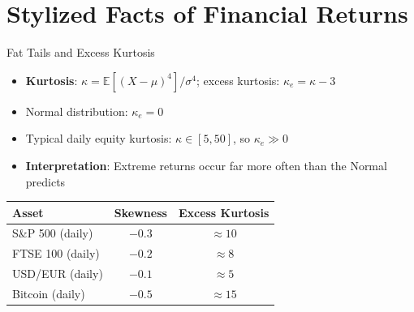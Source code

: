 \documentclass[9pt, aspectratio=169, t]{beamer}
\theoremstyle{definition}
\newcommand{\E}{\mathbb{E}}
\begin{document}
\section{Stylized Facts of Financial Returns}

\begin{frame}{Fat Tails and Excess Kurtosis}
\begin{itemize}
\item \textbf{Kurtosis}: $\kappa = \E[(X-\mu)^4]/\sigma^4$; \quad excess kurtosis: $\kappa_e = \kappa - 3$
\item Normal distribution: $\kappa_e = 0$
\item Typical daily equity kurtosis: $\kappa \in [5, 50]$, so $\kappa_e \gg 0$
\item \textbf{Interpretation}: Extreme returns occur far more often than the Normal predicts
\end{itemize}

\vspace{0.2cm}
\begin{center}
\renewcommand{\arraystretch}{1.1}
\begin{tabular}{lcc}
\toprule
\textbf{Asset} & \textbf{Skewness} & \textbf{Excess Kurtosis} \\
\midrule
S\&P 500 (daily) & $-0.3$ & $\approx 10$ \\
FTSE 100 (daily) & $-0.2$ & $\approx 8$ \\
USD/EUR (daily) & $-0.1$ & $\approx 5$ \\
Bitcoin (daily) & $-0.5$ & $\approx 15$ \\
\bottomrule
\end{tabular}
\end{center}
\end{frame}
\end{document}
